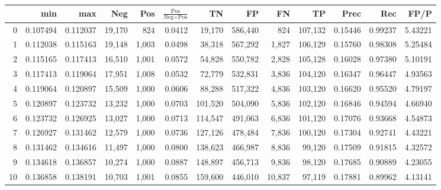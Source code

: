 \begin{tabular}{rrrrrrrrrrrrr}
\toprule
{} &       min &       max &     Neg &    Pos & $\frac{\text{Pos}}{\text{Neg}+\text{Pos}}$ &       TN &       FP &       FN &       TP &     Prec &      Rec &     FP/P \\
\midrule
0   &  0.107494 &  0.112037 &  19,170 &    824 &                                     0.0412 &   19,170 &  586,440 &      824 &  107,132 &  0.15446 &  0.99237 &  5.43221 \\
1   &  0.112038 &  0.115163 &  19,148 &  1,003 &                                     0.0498 &   38,318 &  567,292 &    1,827 &  106,129 &  0.15760 &  0.98308 &  5.25484 \\
2   &  0.115165 &  0.117413 &  16,510 &  1,001 &                                     0.0572 &   54,828 &  550,782 &    2,828 &  105,128 &  0.16028 &  0.97380 &  5.10191 \\
3   &  0.117413 &  0.119064 &  17,951 &  1,008 &                                     0.0532 &   72,779 &  532,831 &    3,836 &  104,120 &  0.16347 &  0.96447 &  4.93563 \\
4   &  0.119064 &  0.120897 &  15,509 &  1,000 &                                     0.0606 &   88,288 &  517,322 &    4,836 &  103,120 &  0.16620 &  0.95520 &  4.79197 \\
5   &  0.120897 &  0.123732 &  13,232 &  1,000 &                                     0.0703 &  101,520 &  504,090 &    5,836 &  102,120 &  0.16846 &  0.94594 &  4.66940 \\
6   &  0.123732 &  0.126925 &  13,027 &  1,000 &                                     0.0713 &  114,547 &  491,063 &    6,836 &  101,120 &  0.17076 &  0.93668 &  4.54873 \\
7   &  0.126927 &  0.131462 &  12,579 &  1,000 &                                     0.0736 &  127,126 &  478,484 &    7,836 &  100,120 &  0.17304 &  0.92741 &  4.43221 \\
8   &  0.131462 &  0.134616 &  11,497 &  1,000 &                                     0.0800 &  138,623 &  466,987 &    8,836 &   99,120 &  0.17509 &  0.91815 &  4.32572 \\
9   &  0.134618 &  0.136857 &  10,274 &  1,000 &                                     0.0887 &  148,897 &  456,713 &    9,836 &   98,120 &  0.17685 &  0.90889 &  4.23055 \\
10  &  0.136858 &  0.138191 &  10,703 &  1,001 &                                     0.0855 &  159,600 &  446,010 &   10,837 &   97,119 &  0.17881 &  0.89962 &  4.13141 \\

\end{tabular}
